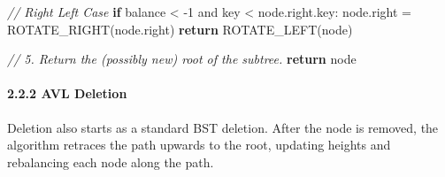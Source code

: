 \documentclass[
]{article}
\newenvironment{Shaded}{}{}
\newcommand{\CommentTok}[1]{\textcolor[rgb]{0.38,0.63,0.69}{\textit{#1}}}
\newcommand{\ControlFlowTok}[1]{\textcolor[rgb]{0.00,0.44,0.13}{\textbf{#1}}}
\newcommand{\DecValTok}[1]{\textcolor[rgb]{0.25,0.63,0.44}{#1}}
\newcommand{\NormalTok}[1]{#1}
\begin{document}
\begin{pcode}
\begin{Shaded}
\begin{Highlighting}[]
  \CommentTok{// Right Left Case}
  \ControlFlowTok{if}\NormalTok{ balance \textless{} {-}}\DecValTok{1}\NormalTok{ and key \textless{} node.right.key:}
\NormalTok{    node.right = ROTATE\_RIGHT(node.right)}
    \ControlFlowTok{return}\NormalTok{ ROTATE\_LEFT(node)}

  \CommentTok{// 5. Return the (possibly new) root of the subtree.}
  \ControlFlowTok{return}\NormalTok{ node}
\end{Highlighting}
\end{Shaded}

\end{pcode}

\hypertarget{avl-deletion}{%
\paragraph{2.2.2 AVL Deletion}\label{avl-deletion}}

Deletion also starts as a standard BST deletion. After the node is
removed, the algorithm retraces the path upwards to the root, updating
heights and rebalancing each node along the path.
\end{document}
